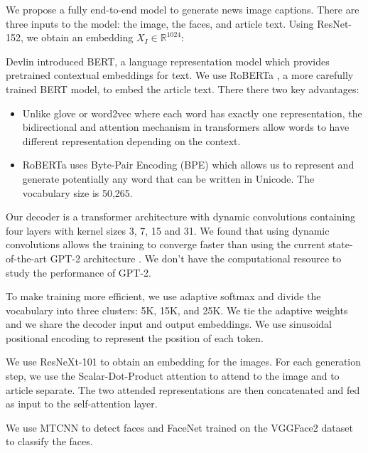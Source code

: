 \documentclass[10pt,twocolumn,letterpaper]{article}
\begin{document}
We propose a fully end-to-end model to generate news image captions. There
are three inputs to the model: the image, the faces, and article text. Using
ResNet-152, we obtain an embedding $X_I \in \mathbb{R}^{1024}$:



Devlin \etal \cite{Devlin2019BERT} introduced BERT, a language representation
model which provides pretrained contextual embeddings for text. We use
RoBERTa \cite{Liu2019RoBERTaAR}, a more carefully trained BERT model, to
embed the article text. There there two key advantages:

\begin{itemize}
   \item Unlike glove \cite{Pennington2014Glove} or word2vec
   \cite{Mikolov2013DistributedRO} where each word has exactly one
   representation, the bidirectional and attention mechanism in transformers
   allow words to have different representation depending on the context.
   \item RoBERTa uses Byte-Pair Encoding (BPE)
   \cite{Sennrich2015NeuralMT,Radford2019LanguageMA} which allows us to
   represent and generate potentially any word that can be written in
   Unicode. The vocabulary size is 50,265.
\end{itemize}

Our decoder is a transformer architecture with dynamic convolutions
\cite{Wu2018PayLA} containing four layers with kernel sizes 3, 7, 15 and 31. We
found that using dynamic convolutions allows the training to converge faster
than using the current state-of-the-art GPT-2 architecture
\cite{Radford2019LanguageMA}. We don't have the computational resource to study
the performance of GPT-2.

To make training more efficient, we use adaptive softmax
\cite{Grave2016EfficientSA} and divide the vocabulary into three clusters: 5K,
15K, and 25K. We tie the adaptive weights and we share the decoder input and
output embeddings. We use sinusoidal positional encoding
\cite{Vaswani2017AttentionIA} to represent the position of each token.

We use ResNeXt-101 \cite{Xie2017AggregatedRT} to obtain an embedding for
the images. For each generation step, we use the Scalar-Dot-Product attention
\cite{Vaswani2017AttentionIA} to attend to the image and to article separate.
The two attended representations are then concatenated and fed as input to
the self-attention layer.

We use MTCNN \cite{Zhang2016JointFD} to detect faces and FaceNet
\cite{Schroff2015FaceNetAU} trained on the VGGFace2 dataset
\cite{Cao2017VGGFace2AD}
to classify the faces.
\end{document}
